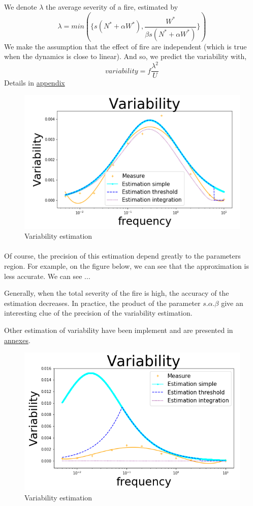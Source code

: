 \documentclass{article}
\begin{document}
We denote $\lambda$ the average severity of a fire, estimated by
\[
\lambda = min(\{s(N^*+\alpha W^*), \frac{W^*}{\beta s (N^*+\alpha W^*)}\})
\]
We make the assumption that the effect of fire are independent (which is true when the dynamics is close to linear).
And so, we predict the variability with, \cite{zelnik_impact_2018}
\[
variability = f\frac{\lambda^2}{U}
\]
Details in \hyperref[variability_estimation]{appendix}


\begin{figure}[h!]
\centering
\includegraphics[width=10.cm]{variability_good.png}
\caption{Variability estimation}
\end{figure}

\paragraph{}
Of course, the precision of this estimation depend greatly to the parameters region. For example, on the figure below, we can see that the approximation is less accurate. We can see ... 

Generally, when the total severity of the fire is high, the accuracy of the estimation decreases. In practice, the product of the parameter $s.\alpha.\beta$ give an interesting clue of the precision of the variability estimation.

Other estimation of variability have been implement and are presented in \hyperref[variability_estimation_other]{annexes}.

\begin{figure}[h!]
\centering
\includegraphics[width=10.cm]{variability_2.png}
\caption{Variability estimation}
\end{figure}
\end{document}
